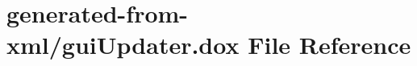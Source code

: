 \hypertarget{guiUpdater_8dox}{}\section{generated-\/from-\/xml/gui\+Updater.dox File Reference}
\label{guiUpdater_8dox}
